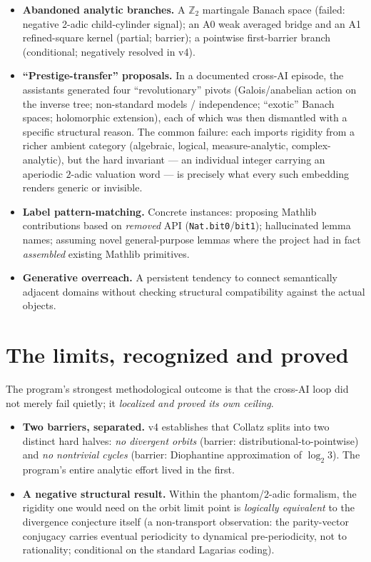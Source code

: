 \documentclass[11pt,a4paper]{article}
\theoremstyle{definition}
\newcommand{\Zp}{\mathbb{Z}_2}
\begin{document}
\begin{itemize}[leftmargin=2em]
  \item \textbf{Abandoned analytic branches.} A $\Zp$ martingale Banach space
        (failed: negative 2-adic child-cylinder signal); an A0 weak averaged
        bridge and an A1 refined-square kernel (partial; barrier); a pointwise
        first-barrier branch (conditional; negatively resolved in v4).
  \item \textbf{``Prestige-transfer'' proposals.} In a documented cross-AI
        episode, the assistants generated four ``revolutionary'' pivots
        (Galois/anabelian action on the inverse tree; non-standard models /
        independence; ``exotic'' Banach spaces; holomorphic extension), each
        of which was then dismantled with a specific structural reason. The
        common failure: each imports rigidity from a richer ambient category
        (algebraic, logical, measure-analytic, complex-analytic), but the hard
        invariant --- an individual integer carrying an aperiodic $2$-adic
        valuation word --- is precisely what every such embedding renders
        generic or invisible.
  \item \textbf{Label pattern-matching.} Concrete instances: proposing
        Mathlib contributions based on \emph{removed} API
        (\texttt{Nat.bit0}/\texttt{bit1}); hallucinated lemma names; assuming
        novel general-purpose lemmas where the project had in fact
        \emph{assembled} existing Mathlib primitives.
  \item \textbf{Generative overreach.} A persistent tendency to connect
        semantically adjacent domains without checking structural
        compatibility against the actual objects.
\end{itemize}

\section{The limits, recognized and proved}
\label{sec:limits}

The program's strongest methodological outcome is that the cross-AI loop did
not merely fail quietly; it \emph{localized and proved its own ceiling}.

\begin{itemize}[leftmargin=2em]
  \item \textbf{Two barriers, separated.} v4 establishes that Collatz splits
        into two distinct hard halves: \emph{no divergent orbits}
        (barrier: distributional-to-pointwise) and \emph{no nontrivial cycles}
        (barrier: Diophantine approximation of $\log_2 3$). The program's
        entire analytic effort lived in the first.
  \item \textbf{A negative structural result.} Within the phantom/$2$-adic
        formalism, the rigidity one would need on the orbit limit point is
        \emph{logically equivalent} to the divergence conjecture itself
        (a non-transport observation: the parity-vector conjugacy carries
        eventual periodicity to dynamical pre-periodicity, not to
        rationality; conditional on the standard Lagarias coding).
\end{itemize}
\end{document}
